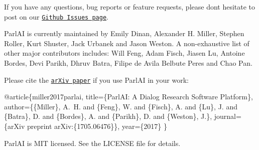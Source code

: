 If you have any questions, bug reports or feature requests, please don\textquotesingle{}t hesitate to post on our \href{https://github.com/facebookresearch/ParlAI/issues}{\tt Github Issues page}.

Parl\+AI is currently maintained by Emily Dinan, Alexander H. Miller, Stephen Roller, Kurt Shuster, Jack Urbanek and Jason Weston. A non-\/exhaustive list of other major contributors includes\+: Will Feng, Adam Fisch, Jiasen Lu, Antoine Bordes, Devi Parikh, Dhruv Batra, Filipe de Avila Belbute Peres and Chao Pan.

Please cite the \href{https://arxiv.org/abs/1705.06476}{\tt ar\+Xiv paper} if you use Parl\+AI in your work\+:


\begin{DoxyCode}
@article\{miller2017parlai,
  title=\{ParlAI: A Dialog Research Software Platform\},
  author=\{\{Miller\}, A.~H. and \{Feng\}, W. and \{Fisch\}, A. and \{Lu\}, J. and \{Batra\}, D. and \{Bordes\}, A. and
       \{Parikh\}, D. and \{Weston\}, J.\},
  journal=\{arXiv preprint arXiv:\{1705.06476\}\},
  year=\{2017\}
\}
\end{DoxyCode}


Parl\+AI is M\+IT licensed. See the L\+I\+C\+E\+N\+SE file for details. 